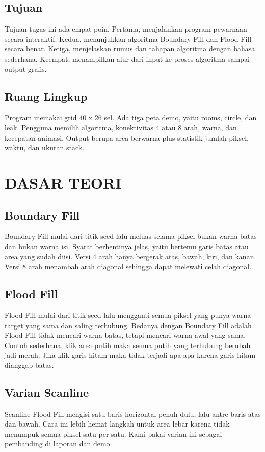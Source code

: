 ﻿\documentclass[12pt,a4paper]{article}
\begin{document}
\subsection{Tujuan}
Tujuan tugas ini ada empat poin. Pertama, menjalankan program pewarnaan secara interaktif. Kedua, menunjukkan algoritma Boundary Fill dan Flood Fill secara benar. Ketiga, menjelaskan rumus dan tahapan algoritma dengan bahasa sederhana. Keempat, menampilkan alur dari input ke proses algoritma sampai output grafis.
\subsection{Ruang Lingkup}
Program memakai grid 40 x 26 sel. Ada tiga peta demo, yaitu rooms, circle, dan leak. Pengguna memilih algoritma, konektivitas 4 atau 8 arah, warna, dan kecepatan animasi. Output berupa area berwarna plus statistik jumlah piksel, waktu, dan ukuran stack.
\section{DASAR TEORI}
\subsection{Boundary Fill}
Boundary Fill mulai dari titik seed lalu meluas selama piksel bukan warna batas dan bukan warna isi. Syarat berhentinya jelas, yaitu bertemu garis batas atau area yang sudah diisi. Versi 4 arah hanya bergerak atas, bawah, kiri, dan kanan. Versi 8 arah menambah arah diagonal sehingga dapat melewati celah diagonal.
\subsection{Flood Fill}
Flood Fill mulai dari titik seed lalu mengganti semua piksel yang punya warna target yang sama dan saling terhubung. Bedanya dengan Boundary Fill adalah Flood Fill tidak mencari warna batas, tetapi mencari warna awal yang sama. Contoh sederhana, klik area putih maka semua putih yang terhubung berubah jadi merah. Jika klik garis hitam maka tidak terjadi apa apa karena garis hitam dianggap batas.
\subsection{Varian Scanline}
Scanline Flood Fill mengisi satu baris horizontal penuh dulu, lalu antre baris atas dan bawah. Cara ini lebih hemat langkah untuk area lebar karena tidak menumpuk semua piksel satu per satu. Kami pakai varian ini sebagai pembanding di laporan dan demo.
\end{document}
